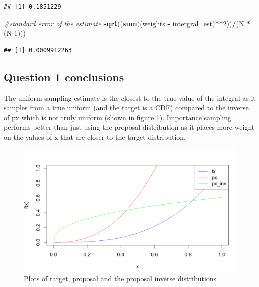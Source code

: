 \documentclass[
]{article}
\newenvironment{Shaded}{\begin{snugshade}}{\end{snugshade}}
\newcommand{\CommentTok}[1]{\textcolor[rgb]{0.56,0.35,0.01}{\textit{#1}}}
\newcommand{\DecValTok}[1]{\textcolor[rgb]{0.00,0.00,0.81}{#1}}
\newcommand{\FunctionTok}[1]{\textcolor[rgb]{0.13,0.29,0.53}{\textbf{#1}}}
\newcommand{\NormalTok}[1]{#1}
\newcommand{\SpecialCharTok}[1]{\textcolor[rgb]{0.81,0.36,0.00}{\textbf{#1}}}
\begin{document}
\begin{verbatim}
## [1] 0.1851229
\end{verbatim}

\begin{Shaded}
\begin{Highlighting}[]
\CommentTok{\#standard error of the estimate}
\FunctionTok{sqrt}\NormalTok{((}\FunctionTok{sum}\NormalTok{((weights }\SpecialCharTok{{-}}\NormalTok{ intergral\_est)}\SpecialCharTok{**}\DecValTok{2}\NormalTok{))}\SpecialCharTok{/}\NormalTok{(N }\SpecialCharTok{*}\NormalTok{ (N}\DecValTok{{-}1}\NormalTok{)))}
\end{Highlighting}
\end{Shaded}

\begin{verbatim}
## [1] 0.0009912263
\end{verbatim}

\hypertarget{question-1-conclusions}{%
\subsection{Question 1 conclusions}\label{question-1-conclusions}}

The uniform sampling estimate is the closest to the true value of the
integral as it samples from a true uniform (and the target is a CDF)
compared to the inverse of px which is not truly uniform (shown in
figure 1). Importance sampling performs better than just using the
proposal distribution as it places more weight on the values of x that
are closer to the target distribution.

\begin{figure}
\centering
\includegraphics[width=5.60417in,height=\textheight]{qtn1.png}
\caption{Plots of target, proposal and the proposal inverse
distributions}
\end{figure}
\end{document}
